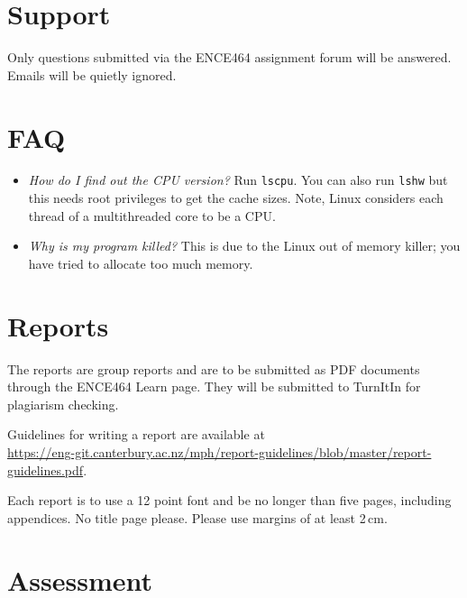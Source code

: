\documentclass[a4paper,11pt]{article}
\newcommand{\code}[1]{\texttt{#1}}
\begin{document}
\section{Support}

Only questions submitted via the ENCE464 assignment forum will be
answered.  Emails will be quietly ignored.


\section{FAQ}

\begin{itemize}
\item \emph{How do I find out the CPU version?}  Run \code{lscpu}.
  You can also run \code{lshw} but this needs root privileges to get
  the cache sizes.  Note, Linux considers each thread of a
  multithreaded core to be a CPU.

\item \emph{Why is my program killed?}  This is due to the Linux out
  of memory killer; you have tried to allocate too much memory.



\end{itemize}



\section{Reports}

The reports are group reports and are to be submitted as PDF documents
through the ENCE464 Learn page.  They will be submitted to TurnItIn
for plagiarism checking.

Guidelines for writing a report are available at\\
\url{https://eng-git.canterbury.ac.nz/mph/report-guidelines/blob/master/report-guidelines.pdf}.

Each report is to use a 12 point font and be no longer than five
pages, including appendices.  No title page please.  Please use
margins of at least 2\,cm.


\section{Assessment}
\end{document}
